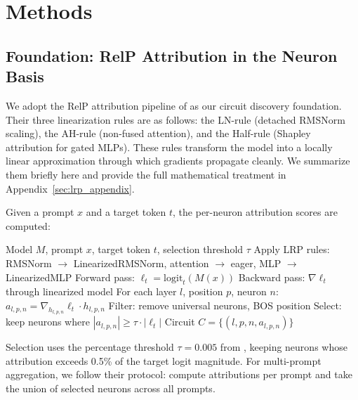 \documentclass[11pt]{article}
\begin{document}
\section{Methods}
\label{sec:method}

\subsection{Foundation: RelP Attribution in the Neuron Basis}
\label{sec:foundation}

We adopt the RelP attribution pipeline of \citet{arora2025circuits} as our circuit discovery foundation.
Their three linearization rules are as follows: the LN-rule (detached RMSNorm scaling), the AH-rule (non-fused attention), and the Half-rule (Shapley attribution for gated MLPs). These rules transform the model into a locally linear approximation through which gradients propagate cleanly.
We summarize them briefly here and provide the full mathematical treatment in Appendix~\ref{sec:lrp_appendix}.

Given a prompt $x$ and a target token $t$, the per-neuron attribution scores are computed:

\begin{algorithm}[h]
\caption{Neuron Circuit Discovery via RelP \citep{arora2025circuits}}
\label{alg:discovery}
\begin{algorithmic}[1]
\REQUIRE Model $M$, prompt $x$, target token $t$, selection threshold $\tau$
\STATE Apply LRP rules: RMSNorm $\to$ LinearizedRMSNorm, attention $\to$ eager, MLP $\to$ LinearizedMLP
\STATE Forward pass: $\ell_t = \text{logit}_t(M(x))$
\STATE Backward pass: $\nabla \ell_t$ through linearized model
\STATE For each layer $l$, position $p$, neuron $n$: $a_{l,p,n} = \nabla_{h_{l,p,n}} \ell_t \cdot h_{l,p,n}$
\STATE Filter: remove universal neurons, BOS position
\STATE Select: keep neurons where $|a_{l,p,n}| \geq \tau \cdot |\ell_t|$
\RETURN Circuit $C = \{(l, p, n, a_{l,p,n})\}$
\end{algorithmic}
\end{algorithm}

\noindent
Selection uses the percentage threshold $\tau = 0.005$ from \citet{arora2025circuits}, keeping neurons whose attribution exceeds 0.5\% of the target logit magnitude.
For multi-prompt aggregation, we follow their protocol: compute attributions per prompt and take the union of selected neurons across all prompts.
\end{document}
